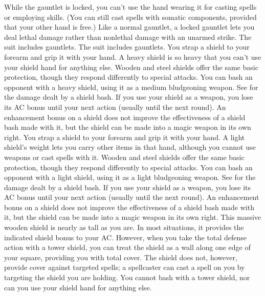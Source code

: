 \par While the gauntlet is locked, you can't use the hand wearing it for casting spells or employing skills. (You can still cast spells with somatic components, provided that your other hand is free.)
Like a normal gauntlet, a locked gauntlet lets you deal lethal damage rather than nonlethal damage with an unarmed strike.
 The suit includes gauntlets.
 The suit includes gauntlets.
 You strap a shield to your forearm and grip it with your hand. A heavy shield is so heavy that you can't use your shield hand for anything else.
 Wooden and steel shields offer the same basic protection, though they respond differently to special attacks.
 You can bash an opponent with a heavy shield, using it as a medium bludgeoning weapon. See  for the damage dealt by a shield bash.  If you use your shield as a weapon, you lose its AC bonus until your next action (usually until the next round). An enhancement bonus on a shield does not improve the effectiveness of a shield bash made with it, but the shield can be made into a magic weapon in its own right.
 You strap a shield to your forearm and grip it with your hand. A light shield's weight lets you carry other items in that hand, although you cannot use weapons or cast spells with it.
 Wooden and steel shields offer the same basic protection, though they respond differently to special attacks.
 You can bash an opponent with a light shield, using it as a light bludgeoning weapon. See  for the damage dealt by a shield bash. If you use your shield as a weapon, you lose its AC bonus until your next action (usually until the next round). An enhancement bonus on a shield does not improve the effectiveness of a shield bash made with it, but the shield can be made into a magic weapon in its own right.
 This massive wooden shield is nearly as tall as you are. In most situations, it provides the indicated shield bonus to your AC. However, when you take the total defense action with a tower shield, you can treat the shield as a wall along one edge of your square, providing you with total cover. The shield does not, however, provide cover against targeted spells; a spellcaster can cast a spell on you by targeting the shield you are holding. You cannot bash with a tower shield, nor can you use your shield hand for anything else.
